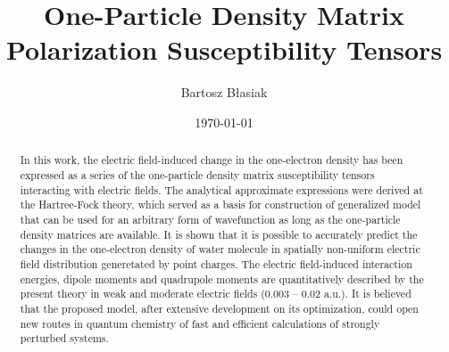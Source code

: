 \documentclass[aip,amsmath,amssymb,reprint,floatfix]{revtex4-1}
\begin{document}

\title{One-Particle Density Matrix Polarization Susceptibility Tensors}

\author{Bartosz B{\l}asiak}

\date{\today}

\begin{abstract}


In this work, the electric field\hyp{}induced change in the one\hyp{}electron density
has been expressed as a series of the one\hyp{}particle density matrix susceptibility tensors
interacting with electric fields. The analytical approximate expressions were derived
at the Hartree\hyp{}Fock theory, which served as a basis for construction of generalized
model that can be used for an arbitrary form of wavefunction as long as the one\hyp{}particle
density matrices are available. It is shown that it is possible to accurately predict the changes
in the one\hyp{}electron density of water molecule in spatially non\hyp{}uniform electric field distribution
generetated by point charges. The electric field\hyp{}induced interaction energies,
dipole moments and quadrupole moments
are quantitatively described by the present theory in weak and moderate electric fields (0.003 -- 0.02 a.u.).
It is believed that the proposed model, after extensive development on its optimization, could open
new routes in quantum chemistry of fast and efficient calculations of strongly perturbed systems.
\end{abstract}

\pacs{}%

\maketitle %
\end{document}
